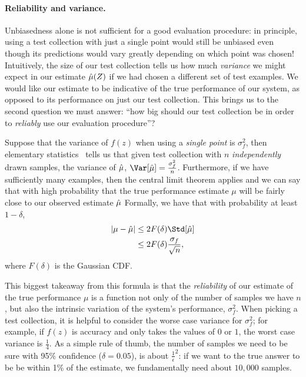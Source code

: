 \paragraph{Reliability and variance.}
Unbiasedness alone is not sufficient for a good evaluation procedure: in principle, using a test collection with just a single point would still be unbiased even though its predictions would vary greatly depending on which point was chosen!
Intuitively, the size of our test collection tells us how much \textit{variance} we might expect in our estimate $\hat{\mu}(Z)$ if we had chosen a different set of test examples.  
We would like our estimate to be indicative of the true performance of our system, as opposed to its performance on just our test collection.
This brings us to the second question we must answer: ``how big should our test collection be in order to \textit{reliably} use our evaluation procedure''?

Suppose that the variance of $f(z)$ when using a \textit{single point} is $\sigma^2_f$, then
elementary statistics~\citep{casella1990statistical} tells us that given test collection with $n$ \textit{independently} drawn samples, the variance of $\hat{\mu}$, $\Var[\muh] = \frac{\sigma^2_f}{n}$.
Furthermore, if we have sufficiently many examples, then the central limit theorem applies and we can say that with high probability that the true performance estimate $\mu$ will be fairly close to our observed estimate $\hat{\mu}$
Formally, we have that with probability at least $1 - \delta$,
\begin{align*}
  |\mu - \muh| &\le 2F(\delta) \Std[\muh] \\
  &\le 2F(\delta) \frac{\sigma_f}{\sqrt{n}},
\end{align*}
where $F(\delta)$ is the Gaussian CDF.\@

This biggest takeaway from this formula is that the \textit{reliability} of our estimate of the true performance $\mu$ is a function not only of the number of samples we have $n$, but also the intrinsic variation of the system's performance, $\sigma^2_f$.
When picking a test collection, it is helpful to consider the worse case variance for $\sigma^2_f$; for example, if $f(z)$ is accuracy and only takes the values of $0$ or $1$, the worst case variance is $\frac{1}{4}$.
As a simple rule of thumb, the number of samples we need to be sure with 95\% confidence ($\delta = 0.05$), is about $\frac{1}{\epsilon}^2$: if we want to the true answer to be be within 1\% of the estimate, we fundamentally need about $10,000$ samples.

